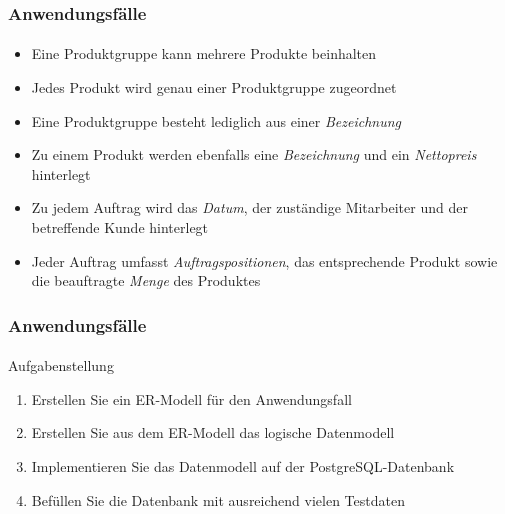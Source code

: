 \begin{frame}[t]
\frametitle{Anwendungsf\"alle}
\framesubtitle{\insertsubsection}
	\begin{itemize}
		\item Eine Produktgruppe kann mehrere Produkte beinhalten 
		\item Jedes Produkt wird genau einer Produktgruppe zugeordnet 
		\item Eine Produktgruppe besteht lediglich aus einer \textit{Bezeichnung} 
		\item Zu einem Produkt werden ebenfalls eine \textit{Bezeichnung} und ein \textit{Nettopreis} hinterlegt
	\end{itemize}
  \abs 
	\begin{itemize}
		\item Zu jedem Auftrag wird das \emph{Datum}, der zuständige Mitarbeiter und der betreffende Kunde hinterlegt 
		\item Jeder Auftrag umfasst \emph{Auftragspositionen}, das entsprechende Produkt sowie die beauftragte \emph{Menge} des Produktes
	\end{itemize}
\end{frame}
	
\begin{frame}[t]
\frametitle{Anwendungsf\"alle}
\framesubtitle{\insertsubsection}
		\begin{alertblock}{Aufgabenstellung}
			\begin{enumerate}
				\item Erstellen Sie ein ER-Modell für den Anwendungsfall
				\item Erstellen Sie aus dem ER-Modell das logische Datenmodell 
				\item Implementieren Sie das Datenmodell auf der PostgreSQL-Datenbank 
				\item Befüllen Sie die Datenbank mit ausreichend vielen Testdaten 
			\end{enumerate}
		\end{alertblock}
\end{frame}

